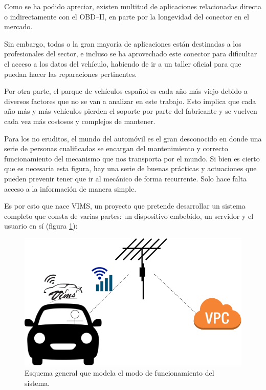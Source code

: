 Como se ha podido apreciar, existen multitud de aplicaciones relacionadas directa
o indirectamente con el \ac{OBD}--II, en parte por la longevidad del conector
en el mercado.

Sin embargo, todas o la gran mayoría de aplicaciones están destinadas a los profesionales
del sector, e incluso se ha aprovechado este conector para dificultar el acceso a
los datos del vehículo, habiendo de ir a un taller oficial para que puedan hacer
las reparaciones pertinentes.

Por otra parte, el parque de vehículos español es cada año más viejo debido a
diversos factores que no se van a analizar en este trabajo. Esto implica que cada
año más y más vehículos pierden el soporte por parte del fabricante y se vuelven
cada vez más costosos y complejos de mantener.

Para los no eruditos, el mundo del automóvil es el gran desconocido en donde una
serie de personas cualificadas se encargan del mantenimiento y correcto funcionamiento
del mecanismo que nos transporta por el mundo. Si bien es cierto que es necesaria
esta figura, hay una serie de buenas prácticas y actuaciones que pueden prevenir
tener que ir al mecánico de forma recurrente. Solo hace falta acceso a la información
de manera simple.

Es por esto que nace \ac{VIMS}, un proyecto que pretende desarrollar un sistema completo
que consta de varias partes: un dispositivo embebido, un servidor y el usuario en sí
(figura \ref{fig:general-scheme}):

\begin{figure}[H]
  \centering
  \includegraphics[width=\linewidth]{images/general-scheme.png}
  \caption{Esquema general que modela el modo de funcionamiento del sistema.}
  \label{fig:general-scheme}
\end{figure}

